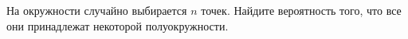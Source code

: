 \documentclass{article}
\begin{document}
На окружности случайно выбирается $n$ точек. Найдите вероятность того, что все они принадлежат некоторой полуокружности.
\end{document}
